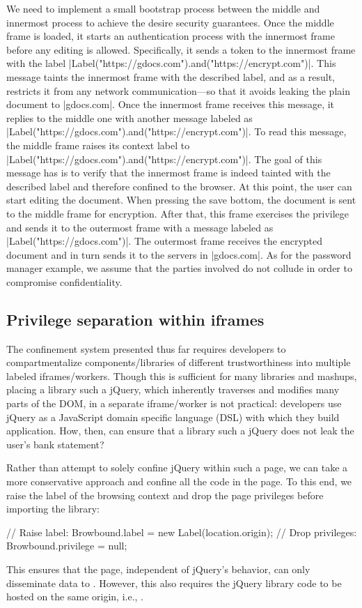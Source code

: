We need to implement a small bootstrap process between the middle and innermost
process to achieve the desire security guarantees. Once the middle frame is
loaded, it starts an authentication process with the innermost frame before any
editing is allowed. Specifically, it sends a token to the innermost
frame with the label \js|Label("https://gdocs.com").and("https://encrypt.com")|.
This message taints the innermost frame with the described label, and as a
result, restricts it from any network communication---so that it avoids leaking
the plain document to \js|gdocs.com|. Once the innermost frame receives this
message, it replies to the middle one with another message labeled as
\js|Label("https://gdocs.com").and("https://encrypt.com")|. To read this
message, the middle frame raises its context label to
\js|Label("https://gdocs.com").and("https://encrypt.com")|. The goal of this
message has is to verify that the innermost frame is indeed tainted with the
described label and therefore confined to the browser. At this point, the user
can start editing the document.  When pressing the save bottom, the document is
sent to the middle frame for encryption. After that, this frame exercises the
privilege  and sends it to the outermost frame with a message
labeled as \js|Label("https://gdocs.com")|. The outermost frame receives the
encrypted document and in turn sends it to the servers in \js|gdocs.com|. As for
the password manager example, we assume that the parties involved do not collude
in order to compromise confidentiality. 




\subsection{Privilege separation within iframes}
\label{sec:system:script}

The confinement system presented thus far requires developers to
compartmentalize components/libraries of different trustworthiness into
multiple labeled iframes/workers.
%
Though this is sufficient for many libraries and mashups, placing a library
such a jQuery, which inherently traverses and modifies many parts of the DOM,
in a separate iframe/worker is not practical: developers use jQuery as a
JavaScript domain specific language (DSL) with which they build application.
%
How, then, can  ensure that a library such a jQuery does not
leak the user's bank statement?

Rather than attempt to solely confine jQuery within such a page, we
can take a more conservative approach and confine all the code in the
page.
%
To this end, we raise the label of the browsing context and drop the
page privileges before importing the library:
\begin{jscode}
// Raise label:
Browbound.label = new Label(location.origin);
// Drop privileges:
Browbound.privilege = null;
\end{jscode}
%
This ensures that the page, independent of jQuery's behavior, can only
disseminate data to .
%
However, this also requires the jQuery library code to be hosted on
the same origin, i.e., .
%

